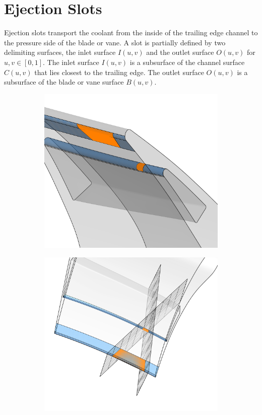 \documentclass[a4paper, 11pt]{report}
\theoremstyle{definition}
\begin{document}
\section{Ejection Slots}\label{sec:slots}
	Ejection slots transport the coolant from the inside of the trailing edge channel to the pressure side of the blade or vane. A slot is partially defined by two delimiting surfaces, the inlet surface $I(u,v)$ and the outlet surface $O(u,v)$ for $u,v \in [0,1]$. The inlet surface $I(u,v)$ is a subsurface of the channel surface $C(u,v)$ that lies closest to the trailing edge. The outlet surface $O(u,v)$ is a subsurface of the blade or vane surface $B(u,v)$.

	\begin{figure}[H]
		\centering
		\begin{subfigure}{.45\textwidth}
			\includegraphics[width=\textwidth]{../tec/slots/14.png}
		\end{subfigure}
		\begin{subfigure}{.45\textwidth}
			\includegraphics[width=\textwidth]{../tec/slots/15.png}

\end{subfigure}
\end{figure}
\end{document}
